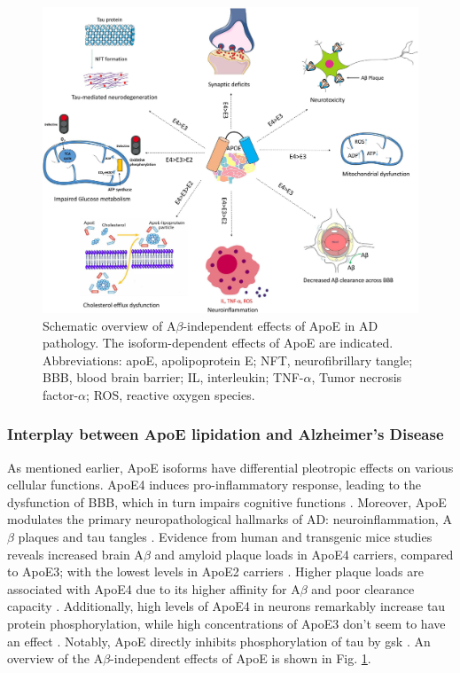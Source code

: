 \documentclass{amsart}
\theoremstyle{plain}
\begin{document}
\begin{figure}[]
  \includegraphics[width=\textwidth]{figures/ApoEeffects.jpg}
    \caption{Schematic overview of A$\beta$-independent effects of ApoE in AD pathology. The isoform-dependent effects of ApoE are indicated. Abbreviations: apoE, apolipoprotein E; NFT, neurofibrillary tangle; BBB, blood brain barrier; IL, interleukin; TNF-$\alpha$, Tumor necrosis factor-$\alpha$; ROS, reactive oxygen species. \cite{Husain2021APOETherapeutics}}
  \label{ApoeEffects}
\end{figure}

\subsubsection{Interplay between ApoE lipidation and Alzheimer's Disease}\label{ApoEAD}
As mentioned earlier, ApoE isoforms have differential pleotropic effects on various cellular functions. ApoE4 induces pro-inflammatory response, leading to the dysfunction of BBB, which in turn impairs cognitive functions \cite{Marottoli2017PeripheralDysfunction, Teng2017ApoEInjury, Kloske2020TheDisease}. Moreover, ApoE modulates the primary neuropathological hallmarks of AD: neuroinflammation, A$\beta$ plaques and tau tangles \cite{Husain2021APOETherapeutics}. Evidence from human and transgenic mice studies reveals increased brain A$\beta$ and amyloid plaque loads in ApoE4 carriers, compared to ApoE3; with the lowest levels in ApoE2 carriers \cite{Huang2017ApoE2Secretion, Tachibana2016RescuingLRP1, Safieh2019ApoE4:Disease}. Higher plaque loads are associated with ApoE4 due to its higher affinity for A$\beta$ and poor clearance capacity \cite{Kloske2020TheDisease}. Additionally, high levels of ApoE4 in neurons remarkably increase tau protein phosphorylation, while high concentrations of ApoE3 don't seem to have an effect \cite{Cao2017ApoE4-associatedInjury, Shi2017ApoE4Tauopathy, Vasilevskaya2020InteractionAthletes, Wang2018GainCorrector}. Notably,  ApoE directly inhibits phosphorylation of tau by \acrshort{gsk} \cite{Hoe2006ApolipoproteinNeurons}. An overview of the A$\beta$-independent effects of ApoE is shown in Fig. \ref{ApoeEffects}.
\end{document}
